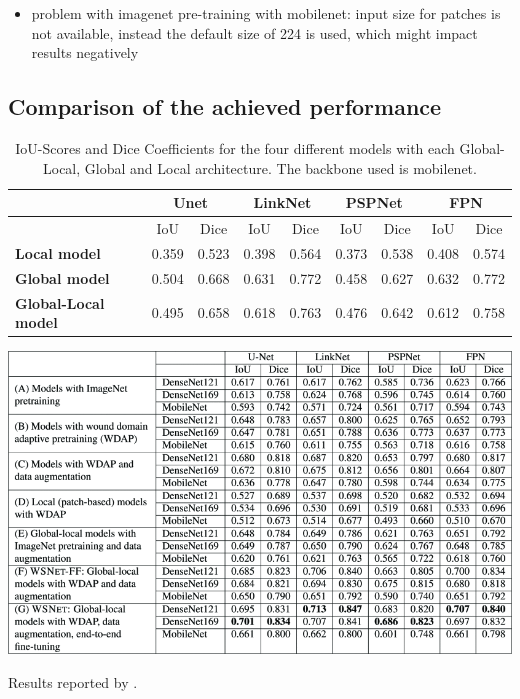 \begin{itemize}
	\item problem with imagenet pre-training with mobilenet: input size for patches is not available, instead the default size of 224 is used, which might impact results negatively
\end{itemize}


\subsection{Comparison of the achieved performance}

\begin{table}[htb!]
	\centering
	\begin{tabular}{l||c | c | c | c | c | c | c | c|}
	& \multicolumn{2}{|c|}{Unet} & \multicolumn{2}{|c|}{LinkNet} & \multicolumn{2}{|c|}{PSPNet} & \multicolumn{2}{|c|}{FPN} \\
	\hline
	& IoU & Dice & IoU & Dice & IoU & Dice & IoU & Dice \\
	\hline\hline
	\textbf{Local model} & 0.359 & 0.523 & 0.398 & 0.564 & 0.373 & 0.538 & 0.408 & 0.574 \\	
	\textbf{Global model} & 0.504 & 0.668 & 0.631 & 0.772 & 0.458 & 0.627 & 0.632 & 0.772 \\
	\textbf{Global-Local model} & 0.495 & 0.658 & 0.618 & 0.763 & 0.476 & 0.642 & 0.612 & 0.758\\
	\end{tabular}
	\caption{IoU-Scores and Dice Coefficients for the four different models with each Global-Local, Global and Local architecture. The backbone used is mobilenet.}
\end{table}

\begin{table}[htb!]
	\centering
	\includegraphics[width=\textwidth]{fig/wsnet-results.png}
	\caption{Results reported by \citeauthor{Oota_2023_WACV} \cite{Oota_2023_WACV}.}
\end{table}

